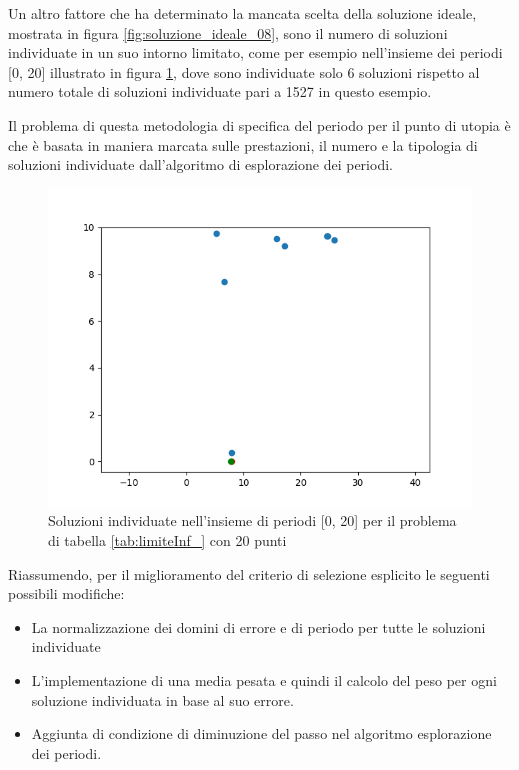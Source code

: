\documentclass[a4paper,12pt]{report}
\begin{document}
Un altro fattore che ha determinato la mancata scelta della soluzione ideale, mostrata in figura \ref{fig:soluzione_ideale_08}, sono il numero di soluzioni individuate in un suo intorno limitato, come per esempio nell'insieme dei periodi [0, 20] illustrato in figura \ref{fig:da_zero_a_venti}, dove sono individuate solo 6 soluzioni rispetto al numero totale di soluzioni individuate pari a 1527 in questo esempio.

Il problema di questa metodologia di specifica del periodo per il punto di utopia è che è basata in maniera marcata sulle prestazioni, il numero e la tipologia di soluzioni individuate dall'algoritmo di esplorazione dei periodi.

\begin{figure}
  \center
  \includegraphics[scale=0.70]{img/puls08/da_zero_a_venti.png}
  \caption{Soluzioni individuate nell'insieme di periodi [0, 20] per il problema di tabella \ref{tab:limiteInf_} con 20 punti}
  \label{fig:da_zero_a_venti}
\end{figure}

Riassumendo, per il miglioramento del criterio di selezione esplicito le seguenti possibili modifiche:
\begin{itemize}
  \item La normalizzazione dei domini di errore e di periodo per tutte le soluzioni individuate
  \item L'implementazione di una media pesata e quindi il calcolo del peso per ogni soluzione individuata in base al suo errore.
  \item Aggiunta di condizione di diminuzione del passo nel algoritmo esplorazione dei periodi.
\end{itemize}
\end{document}
